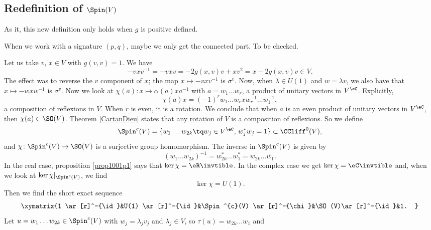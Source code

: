 \subsection{Redefinition of \texorpdfstring{$\Spin(V)$}{Spin(V)}}

As it, this new definition only holds when $g$ is positive defined.

\begin{probleme}
	When we work with a signature $(p,q)$, maybe we only get the connected part. To be checked.
\end{probleme}

Let us take $v$, $x\in V$ with $g(v,v)=1$. We have 
\[ 
  -vxv^{-1}=-vxv=-2g(x,v)v+xv^2
		=x-2g(x,v)v\in V.
\]
The effect was to reverse the $v$ component of $x$; the map $x\mapsto -vxv^{-1}$ is $\sigma^v$. Now, when $\lambda\in U(1)$ and $w=\lambda v$, we also have that $x\mapsto -wxw^{-1}$ is $\sigma^v$. Now we look at $\chi(a)\colon x\mapsto \alpha(a)xa^{-1}$ with $a=w_{1}\ldots w_{r}$, a product of unitary vectors in $V^{\eC}$. Explicitly,
\[ 
  \chi(a)x=(-1)^{r} w_{1}\ldots w_{r}xw_{r}^{-1}\ldots w_{1}^{-1},
\]
a composition of reflexions in $V$. When $r$ is even, it is a rotation. We conclude that when $a$ is an even product of unitary vectors in $V^{\eC}$, then $\chi(a)\in \SO(V)$. Theorem \ref{CartanDieu} states that any rotation of $V$ is a composition of reflexions. So we define
\begin{equation}
\Spin^{c}(V)=\{ w_{1}\ldots w_{2k}\tq w_{j}\in V^{\eC},\,w_{j}^*w_{j}=1 \}\subset \CCliff^{0}(V),
\end{equation}
and $\chi\colon \Spin^{c}(V)\to \SO(V)$ is a surjective group homomorphism. The inverse in $\Spin^{c}(V)$ is given by
\[ 
  (w_{1}\ldots w_{2k})^{-1}=w_{2k}^*\ldots w_{1}^*=\overline{ w_{2k} }\ldots\overline{ w_{1} }.
\]
In the real case, proposition \ref{prop1001p1} says that $\ker\chi=\eR\invtible$. In the complex case we get  $\ker\chi=\eC\invtible$ and, when we look at $\ker\chi|_{\Spin^{c}(V)}$, we find
\begin{equation}
\ker\chi=U(1).
\end{equation}
Then we find the short exact sequence 
\begin{equation}
\xymatrix{%
   1 \ar[r]^-{\id}&U(1) \ar[r]^-{\id}&\Spin^{c}(V) \ar[r]^-{\chi}&\SO(V)\ar[r]^-{\id}&1.
}
\end{equation}
Let $u=w_{1}\ldots w_{2k}\in\Spin^{c}(V)$ with $w_{j}=\lambda_{j}v_{j}$ and $\lambda_{j}\in V$, so $\tau(u)=w_{2k}\ldots w_{1}$ and
